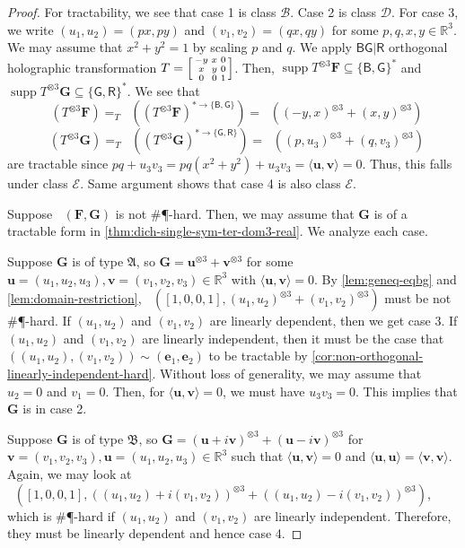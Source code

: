 \documentclass[11pt]{article}
\DeclareMathOperator{\holbs}{Holant^*_2}
\DeclareMathOperator{\holts}{Holant^*_3}
\DeclareMathOperator{\supp}{supp}
\newcommand{\db}{\mathsf{B}}
\newcommand{\dg}{\mathsf{G}}
\newcommand{\dr}{\mathsf{R}}
\newcommand{\sph}{\#\P-hard\xspace}
\newcommand{\teh}{^{\otimes 3}}
\newcommand{\domres}[1]{
  ^{*\to\{#1\}}
}
\newcommand{\tractE}{$\mathscr{B}$\xspace}
\newcommand{\tractBGR}{$\mathscr{D}$\xspace}
\newcommand{\tractBGGRBR}{$\mathscr{E}$\xspace}
\newcommand{\ternarytractgeneq}{$\mathfrak{A}$\xspace}
\newcommand{\ternarytractz}{$\mathfrak{B}$\xspace}
\begin{document}
\begin{proof}
  For tractability, we see that case 1 is class \tractE.
  Case 2 is class \tractBGR.
  For case $3$, we write $(u_1, u_2) = (px, py)$ and $(v_1, v_2) = (qx, qy)$ for some $p, q, x, y \in \mathbb{R}^3$.
  We may assume that $x^2 + y^2 = 1$ by scaling $p$ and $q$.
  We apply $\db \dg | \dr$ orthogonal holographic transformation $T = \begin{bsmallmatrix}
    -y & x & 0 \\
    x & y & 0 \\
    0 & 0 & 1
  \end{bsmallmatrix}$.
  Then, $\supp T\teh \mathbf{F} \subseteq \{\db, \dg\}^*$ and $\supp T\teh \mathbf{G} \subseteq \{\dg, \dr\}^*$.
  We see that 
  \[\holts(T\teh \mathbf{F}) =_T \holbs((T \teh \mathbf{F})\domres{\db, \dg}) = \holbs((-y, x)\teh + (x, y)\teh) \] 
  \[\holts(T\teh \mathbf{G}) =_T \holbs((T \teh \mathbf{G})\domres{\dg, \dr}) = \holbs( (p, u_3)\teh + (q, v_3)\teh)\]
  are tractable since $pq + u_3 v_3 = pq (x^2 + y^2) + u_3 v_3 = \langle \mathbf{u}, \mathbf{v} \rangle = 0$.
  Thus, this falls under class \tractBGGRBR.
  Same argument shows that case 4 is also class \tractBGGRBR.

Suppose $\holts(\mathbf{F}, \mathbf{G})$ is not \sph.
Then, we may assume that $\mathbf{G}$ is of a tractable form in \cref{thm:dich-single-sym-ter-dom3-real}. 
We analyze each case. 

  Suppose $\mathbf{G}$ is of type \ternarytractgeneq, so $\mathbf{G} = \mathbf{u}\teh + \mathbf{v}\teh$ for some $\mathbf{u} = (u_1, u_2, u_3), \mathbf{v} = (v_1, v_2, v_3) \in \mathbb{R}^3$ with $\langle \mathbf{u}, \mathbf{v} \rangle = 0$.
  By \cref{lem:geneq-eqbg} and \cref{lem:domain-restriction}, $\holbs([1, 0, 0, 1], (u_1, u_2) \teh + (v_1, v_2)\teh)$ must be not \sph.
  If $(u_1, u_2)$ and $(v_1, v_2)$ are linearly dependent, then we get case 3.
  If $(u_1, u_2)$ and $(v_1, v_2)$ are linearly independent, then it must be the case that $((u_1, u_2), (v_1, v_2)) \sim (\mathbf{e}_1, \mathbf{e}_2)$ to be tractable by \cref{cor:non-orthogonal-linearly-independent-hard}.
  Without loss of generality, we may assume that $u_2 = 0$ and $v_1 = 0$.
  Then, for $\langle \mathbf{u}, \mathbf{v} \rangle = 0$, we must have $u_3 v_3 = 0$.
  This implies that $\mathbf{G}$ is in case 2.

  Suppose $\mathbf{G}$ is of type \ternarytractz, so 
  $\mathbf{G} = (\mathbf{u} + i \mathbf{v})\teh + (\mathbf{u} - i \mathbf{v})\teh$ for $\mathbf{v} = (v_1, v_2, v_3), \mathbf{u} = (u_1, u_2, u_3) \in \mathbb{R}^3$ such that
  $\langle \mathbf{u}, \mathbf{v} \rangle = 0$ and $\langle \mathbf{u}, \mathbf{u} \rangle = \langle \mathbf{v}, \mathbf{v} \rangle$.
  Again, we may look at $\holbs([1, 0, 0, 1], ((u_1, u_2) + i (v_1, v_2))\teh + ((u_1, u_2) - i (v_1, v_2))\teh)$, which is \sph if $(u_1, u_2)$ and $(v_1, v_2)$ are linearly independent.
  Therefore, they must be linearly dependent and hence case 4.
\end{proof}
\end{document}
